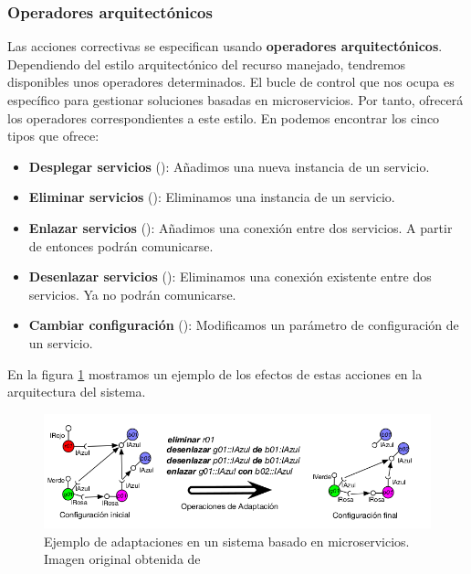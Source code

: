 \subsubsection{Operadores arquitectónicos}

Las acciones correctivas se especifican usando \textbf{operadores arquitectónicos}. \cite{garlanIncreasingSystemDependability2003} Dependiendo del estilo arquitectónico del recurso manejado, tendremos disponibles unos operadores determinados. El bucle de control que nos ocupa es específico para gestionar soluciones basadas en microservicios. Por tanto, ofrecerá los operadores correspondientes a este estilo. En \cite{fonsEspecificacionSistemasAutoadaptativos2021} podemos encontrar los cinco tipos que ofrece:

\begin{itemize}
  \item \textbf{Desplegar servicios} (\textbf{}): Añadimos una nueva instancia de un servicio.

  \item \textbf{Eliminar servicios} (\textbf{}): Eliminamos una instancia de un servicio.

  \item \textbf{Enlazar servicios} (\textbf{}): Añadimos una conexión entre dos servicios. A partir de entonces podrán comunicarse.

  \item \textbf{Desenlazar servicios} (\textbf{}): Eliminamos una conexión existente entre dos servicios. Ya no podrán comunicarse.

  \item \textbf{Cambiar configuración} (\textbf{}): Modificamos un parámetro de configuración de un servicio.
\end{itemize}

En la figura \ref{fig:adaptaciones-microservicios} mostramos un ejemplo de los efectos de estas acciones en la arquitectura del sistema.

\begin{figure}[htb]
  \centering
  \includegraphics[scale=1.8]{cap_sistema_original/images/adaptaciones}
  \caption[Ejemplo de adaptaciones en un sistema basado en microservicios.]{Ejemplo de adaptaciones en un sistema basado en microservicios. Imagen original obtenida de \cite{fonsServiciosAdaptivereadyPara2021}}
  \label{fig:adaptaciones-microservicios}
\end{figure}

